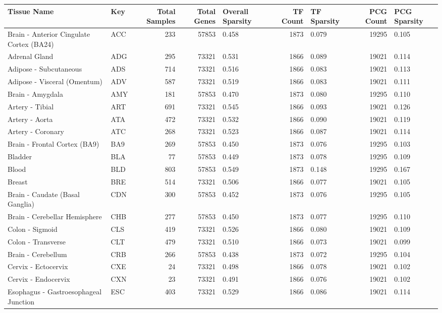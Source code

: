 \begin{tabular}{llrrlrlrl}
\toprule
Tissue Name & Key & Total Samples & Total Genes & Overall Sparsity & TF Count & TF Sparsity & PCG Count & PCG Sparsity \\
\midrule
Brain - Anterior Cingulate Cortex (BA24) & ACC & 233 & 57853 & 0.458 & 1873 & 0.079 & 19295 & 0.105 \\
Adrenal Gland & ADG & 295 & 73321 & 0.531 & 1866 & 0.089 & 19021 & 0.114 \\
Adipose - Subcutaneous & ADS & 714 & 73321 & 0.516 & 1866 & 0.083 & 19021 & 0.113 \\
Adipose - Visceral (Omentum) & ADV & 587 & 73321 & 0.519 & 1866 & 0.083 & 19021 & 0.111 \\
Brain - Amygdala & AMY & 181 & 57853 & 0.470 & 1873 & 0.080 & 19295 & 0.110 \\
Artery - Tibial & ART & 691 & 73321 & 0.545 & 1866 & 0.093 & 19021 & 0.126 \\
Artery - Aorta & ATA & 472 & 73321 & 0.532 & 1866 & 0.090 & 19021 & 0.119 \\
Artery - Coronary & ATC & 268 & 73321 & 0.523 & 1866 & 0.087 & 19021 & 0.114 \\
Brain - Frontal Cortex (BA9) & BA9 & 269 & 57853 & 0.450 & 1873 & 0.076 & 19295 & 0.103 \\
Bladder & BLA & 77 & 57853 & 0.449 & 1873 & 0.078 & 19295 & 0.109 \\
Blood & BLD & 803 & 57853 & 0.549 & 1873 & 0.148 & 19295 & 0.167 \\
Breast & BRE & 514 & 73321 & 0.506 & 1866 & 0.077 & 19021 & 0.105 \\
Brain - Caudate (Basal Ganglia) & CDN & 300 & 57853 & 0.452 & 1873 & 0.076 & 19295 & 0.105 \\
Brain - Cerebellar Hemisphere & CHB & 277 & 57853 & 0.450 & 1873 & 0.077 & 19295 & 0.110 \\
Colon - Sigmoid & CLS & 419 & 73321 & 0.526 & 1866 & 0.080 & 19021 & 0.109 \\
Colon - Transverse & CLT & 479 & 73321 & 0.510 & 1866 & 0.073 & 19021 & 0.099 \\
Brain - Cerebellum & CRB & 266 & 57853 & 0.438 & 1873 & 0.072 & 19295 & 0.104 \\
Cervix - Ectocervix & CXE & 24 & 73321 & 0.498 & 1866 & 0.078 & 19021 & 0.102 \\
Cervix - Endocervix & CXN & 23 & 73321 & 0.491 & 1866 & 0.076 & 19021 & 0.102 \\
Esophagus - Gastroesophageal Junction & ESC & 403 & 73321 & 0.529 & 1866 & 0.086 & 19021 & 0.114 \\

\end{tabular}
